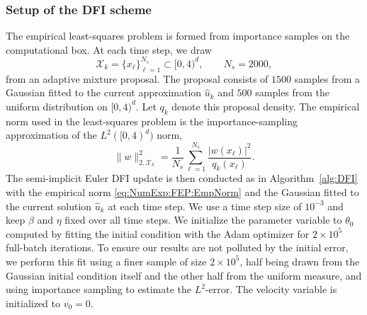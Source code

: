 \documentclass[oneside,11pt]{article}
\theoremstyle{remark}
\theoremstyle{thmstyleone}
\theoremstyle{thmstylethree}
\theoremstyle{thmstyletwo}
\newcommand{\abs}[1]{\lvert #1\rvert}
\newcommand{\norm}[1]{\lVert #1\rVert}
\begin{document}
\subsubsection{Setup of the DFI scheme}
The empirical least-squares problem is formed from importance samples on the computational box. At each time step, we draw
\begin{equation*}
    \mathcal X_k=\{x_\ell\}_{\ell=1}^{N_s}\subset[0,4)^d,
    \qquad
    N_s=2000,
\end{equation*}
from an adaptive mixture proposal. The proposal consists of $1500$ samples from a Gaussian fitted to the current approximation $\hat u_k$ and $500$ samples from the uniform distribution on $[0,4)^d$. Let $q_k$ denote this proposal density. The empirical norm used in the least-squares problem is the importance-sampling approximation of the
$L^2([0,4)^d)$ norm,
\begin{equation}\label{eq:NumExp:FEP:EmpNorm}
    \norm{w}_{2,\mathcal X_k}^2
    =
    \frac{1}{N_s}
    \sum_{\ell=1}^{N_s}
    \frac{\abs{w(x_\ell)}^2}{q_k(x_\ell)}.
\end{equation}
The semi-implicit Euler DFI update is then conducted as in Algorithm~\ref{alg:DFI} with the empirical norm \eqref{eq:NumExp:FEP:EmpNorm} and the Gaussian fitted to the current solution $\hat{u}_k$ at each time step.
We use a time step size of $10^{-3}$ and keep $\beta$ and $\eta$ fixed over all time
steps.
We initialize the parameter variable to $\theta_0$ computed by fitting the initial condition with the Adam optimizer for $2 \times 10^{5}$ full-batch iterations. To ensure our results are not polluted by the initial error, we perform this fit using a finer sample of size $2 \times 10^{5}$, half being drawn from the Gaussian initial condition itself and the other half from the uniform measure, and using importance sampling to estimate the $L^2$-error. The velocity variable is initialized to $v_0=0$.
\end{document}
